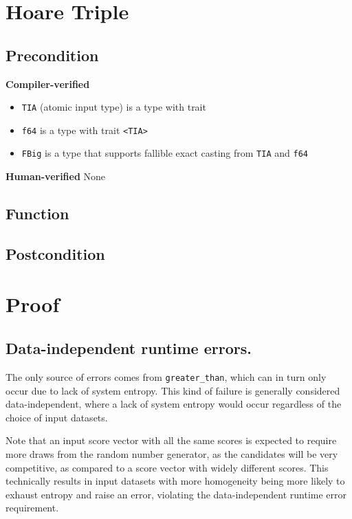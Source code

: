 \documentclass{article}
\begin{document}
 
\section{Hoare Triple} 
\subsection*{Precondition} 
\textbf{Compiler-verified}
\begin{itemize} 
    \item \texttt{TIA} (atomic input type) is a type with trait 
    \item \texttt{f64} is a type with trait \texttt{<TIA>}
    \item \texttt{FBig} is a type that supports fallible exact casting from \texttt{TIA} and \texttt{f64}
\end{itemize} 

\textbf{Human-verified}
None
 
\subsection*{Function} 
\label{sec:python-pseudocode} 
 
 
\subsection*{Postcondition} 
 
 
\section{Proof} 

\subsection{Data-independent runtime errors.}
The only source of errors comes from \texttt{greater\_than}, which can in turn only occur due to lack of system entropy.
This kind of failure is generally considered data-independent, where a lack of system entropy would occur regardless of the choice of input datasets.

Note that an input score vector with all the same scores 
is expected to require more draws from the random number generator,
as the candidates will be very competitive, 
as compared to a score vector with widely different scores. 
This technically results in input datasets with more homogeneity being more likely to exhaust entropy and raise an error,
violating the data-independent runtime error requirement.
\end{document}
